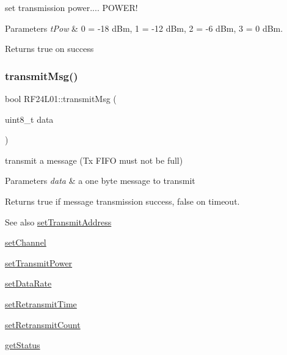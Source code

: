 set transmission power.... P\+O\+W\+E\+R! 
\begin{DoxyParams}{Parameters}
{\em t\+Pow} & 0 = -\/18 d\+Bm, 1 = -\/12 d\+Bm, 2 = -\/6 d\+Bm, 3 = 0 d\+Bm. \\
\hline
\end{DoxyParams}
\begin{DoxyReturn}{Returns}
true on success 
\end{DoxyReturn}
\mbox{\label{namespace_r_f24_l01_a944fa4d57f52eed6ea60495e11ae533a}} 
\subsubsection{\texorpdfstring{transmit\+Msg()}{transmitMsg()}\hspace{0.1cm}{\footnotesize\ttfamily [1/2]}}
{\footnotesize\ttfamily bool R\+F24\+L01\+::transmit\+Msg (\begin{DoxyParamCaption}\item[{uint8\+\_\+t}]{data }\end{DoxyParamCaption})}

transmit a message (Tx F\+I\+FO must not be full) 
\begin{DoxyParams}{Parameters}
{\em data} & a one byte message to transmit \\
\hline
\end{DoxyParams}
\begin{DoxyReturn}{Returns}
true if message transmission success, false on timeout. 
\end{DoxyReturn}
\begin{DoxySeeAlso}{See also}
\mbox{\hyperlink{namespace_r_f24_l01_a03d3bd840dfe193317329eb84c029685}{set\+Transmit\+Address}} 

\mbox{\hyperlink{namespace_r_f24_l01_ab75f49984cfbb8815145f85c3b8c2385}{set\+Channel}} 

\mbox{\hyperlink{namespace_r_f24_l01_a012e78392bee3ef90f145794be638eac}{set\+Transmit\+Power}} 

\mbox{\hyperlink{namespace_r_f24_l01_a79791c76ac83ff495c95d03db5d008b7}{set\+Data\+Rate}} 

\mbox{\hyperlink{namespace_r_f24_l01_a2eb287fa9de64ee6dbe173524a258f47}{set\+Retransmit\+Time}} 

\mbox{\hyperlink{namespace_r_f24_l01_a13376cc173b2063f033526e7930e3847}{set\+Retransmit\+Count}} 

\mbox{\hyperlink{namespace_r_f24_l01_a37ae626e05545579eee5d81c88601c30}{get\+Status}} 
\end{DoxySeeAlso}
\mbox{\label{namespace_r_f24_l01_a97c2db2a1a441dc1de88f1583861e622}} 
